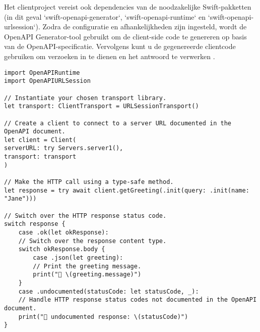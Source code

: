 Het clientproject vereist ook dependencies van de noodzakelijke Swift-pakketten (in dit geval `swift-openapi-generator`, `swift-openapi-runtime` en `swift-openapi-urlsession`). Zodra de configuratie en afhankelijkheden zijn ingesteld, wordt de OpenAPI Generator-tool gebruikt om de client-side code te genereren op basis van de OpenAPI-specificatie. Vervolgens kunt u de gegenereerde clientcode \\gebruiken om verzoeken in te dienen en het antwoord te verwerken \autocite{2024a}.
\begin{lstlisting}[caption=Using generated API Server Stubs]
import OpenAPIRuntime
import OpenAPIURLSession

// Instantiate your chosen transport library.
let transport: ClientTransport = URLSessionTransport()

// Create a client to connect to a server URL documented in the OpenAPI document.
let client = Client(
serverURL: try Servers.server1(),
transport: transport
)

// Make the HTTP call using a type-safe method.
let response = try await client.getGreeting(.init(query: .init(name: "Jane")))

// Switch over the HTTP response status code.
switch response {
    case .ok(let okResponse):
    // Switch over the response content type.
    switch okResponse.body {
        case .json(let greeting):
        // Print the greeting message.
        print("👋 \(greeting.message)")
    }
    case .undocumented(statusCode: let statusCode, _):
    // Handle HTTP response status codes not documented in the OpenAPI document.
    print("🥺 undocumented response: \(statusCode)")
}
\end{lstlisting}